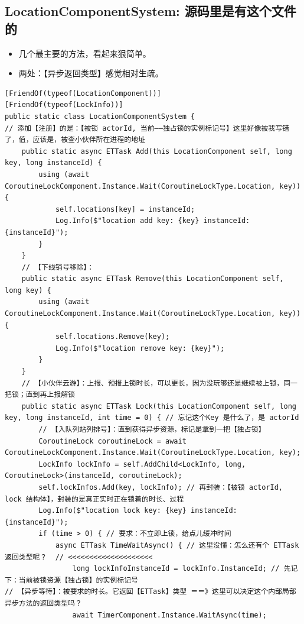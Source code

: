 \documentclass[9pt, b5paper]{article}
\begin{document}
\subsection{LocationComponentSystem: 源码里是有这个文件的}
\label{sec-5-2}
\begin{itemize}
\item 几个最主要的方法，看起来狠简单。
\item 两处：【异步返回类型】感觉相对生疏。
\end{itemize}
\begin{verbatim}
[FriendOf(typeof(LocationComponent))]
[FriendOf(typeof(LockInfo))]
public static class LocationComponentSystem {
// 添加【注册】的是：【被锁 actorId, 当前——独占锁的实例标记号】这里好像被我写错了，值，应该是，被查小伙伴所在进程的地址
    public static async ETTask Add(this LocationComponent self, long key, long instanceId) { 
        using (await CoroutineLockComponent.Instance.Wait(CoroutineLockType.Location, key)) {
            self.locations[key] = instanceId;
            Log.Info($"location add key: {key} instanceId: {instanceId}");
        }
    }
    // 【下线销号移除】：
    public static async ETTask Remove(this LocationComponent self, long key) {
        using (await CoroutineLockComponent.Instance.Wait(CoroutineLockType.Location, key)) {
            self.locations.Remove(key);
            Log.Info($"location remove key: {key}");
        }
    }
    // 【小伙伴云游】：上报、预报上锁时长，可以更长，因为没玩够还是继续被上锁，同一把锁；直到再上报解锁
    public static async ETTask Lock(this LocationComponent self, long key, long instanceId, int time = 0) { // 忘记这个Key 是什么了，是 actorId
        // 【入队列站列排号】：直到获得异步资源，标记是拿到一把【独占锁】
        CoroutineLock coroutineLock = await CoroutineLockComponent.Instance.Wait(CoroutineLockType.Location, key);
        LockInfo lockInfo = self.AddChild<LockInfo, long, CoroutineLock>(instanceId, coroutineLock);
        self.lockInfos.Add(key, lockInfo); // 再封装：【被锁 actorId, lock 结构体】，封装的是真正实时正在锁着的时长、过程
        Log.Info($"location lock key: {key} instanceId: {instanceId}");
        if (time > 0) { // 要求：不立即上锁，给点儿缓冲时间 
            async ETTask TimeWaitAsync() { // 这里没懂：怎么还有个 ETTask 返回类型呢？  // <<<<<<<<<<<<<<<<<<<< 
                long lockInfoInstanceId = lockInfo.InstanceId; // 先记下：当前被锁资源【独占锁】的实例标记号
// 【异步等待】：被要求的时长。它返回【ETTask】类型 ＝＝》这里可以决定这个内部局部异步方法的返回类型吗？
                await TimerComponent.Instance.WaitAsync(time); 

\end{verbatim}
\end{document}
